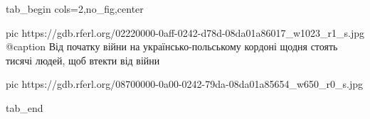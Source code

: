  
 
 
 
 


\ifcmt
  tab_begin cols=2,no_fig,center

     pic https://gdb.rferl.org/02220000-0aff-0242-d78d-08da01a86017_w1023_r1_s.jpg
		 @caption Від початку війни на українсько-польському кордоні щодня стоять тисячі людей, щоб втекти від війни

		 pic https://gdb.rferl.org/08700000-0a00-0242-79da-08da01a85654_w650_r0_s.jpg

  tab_end
\fi
